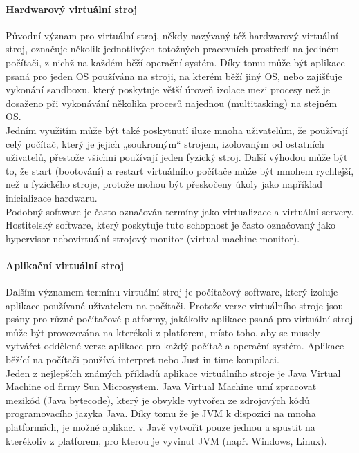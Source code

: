 \documentclass[10pt,a4paper]{article}
\begin{document}
\paragraph{Hardwarový virtuální stroj}
Původní význam pro virtuální stroj, někdy nazývaný též hardwarový virtuální stroj, označuje několik jednotlivých totožných pracovních prostředí na jediném počítači, z nichž na každém běží operační systém. Díky tomu může být aplikace psaná pro jeden OS používána na stroji, na kterém běží jiný OS, nebo zajišťuje vykonání sandboxu, který poskytuje větší úroveň izolace mezi procesy než je dosaženo při vykonávání několika procesů najednou (multitasking) na stejném OS.\\

Jedním využitím může být také poskytnutí iluze mnoha uživatelům, že používají celý počítač, který je jejich „soukromým“ strojem, izolovaným od ostatních uživatelů, přestože všichni používají jeden fyzický stroj. Další výhodou může být to, že start (bootování) a restart virtuálního počítače může být mnohem rychlejší, než u fyzického stroje, protože mohou být přeskočeny úkoly jako například inicializace hardwaru.\\

Podobný software je často označován termíny jako virtualizace a virtuální servery. Hostitelský software, který poskytuje tuto schopnost je často označovaný jako hypervisor nebovirtuální strojový monitor (virtual machine monitor).

\paragraph{Aplikační virtuální stroj}
Dalším významem termínu virtuální stroj je počítačový software, který izoluje aplikace používané uživatelem na počítači. Protože verze virtuálního stroje jsou psány pro různé počítačové platformy, jakákoliv aplikace psaná pro virtuální stroj může být provozována na kterékoli z platforem, místo toho, aby se musely vytvářet oddělené verze aplikace pro každý počítač a operační systém. Aplikace běžící na počítači používá interpret nebo Just in time kompilaci.\\

Jeden z nejlepších známých příkladů aplikace virtuálního stroje je Java Virtual Machine od firmy Sun Microsystem. Java Virtual Machine umí zpracovat mezikód (Java bytecode), který je obvykle vytvořen ze zdrojových kódů programovacího jazyka Java. Díky tomu že je JVM k dispozici na mnoha platformách, je možné aplikaci v Javě vytvořit pouze jednou a spustit na kterékoliv z platforem, pro kterou je vyvinut JVM (např. Windows, Linux).
\end{document}
